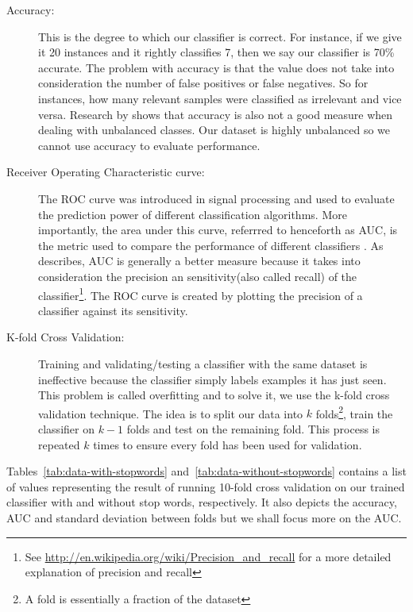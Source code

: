 \begin{description}
  \item[Accuracy:] This is the degree to which our classifier is correct. For instance, if we give
    it 20 instances and it rightly classifies 7, then we say our classifier is 70\% accurate. The
    problem with accuracy is that the value does not take into consideration the number of false
    positives or false negatives. So for instances, how many relevant samples were classified as
    irrelevant and vice versa. Research  by \citet{ling2003auc} shows that accuracy is also not a
    good measure when dealing with unbalanced classes. Our dataset is highly unbalanced so we cannot
    use accuracy to evaluate performance.

  \item[Receiver Operating Characteristic curve:] The ROC curve was introduced in signal processing
    and used to evaluate the prediction power of different classification algorithms. More
    importantly, the area under this curve, referrred to henceforth as AUC, is the metric used to
    compare the performance of different classifiers \citep{bradley1997use}. As \citet{ling2003auc,
    huang2005using} describes, AUC is generally a better measure because it takes into consideration
    the precision an sensitivity(also called recall) of the classifier\footnote{See
      \url{http://en.wikipedia.org/wiki/Precision_and_recall} for a more detailed explanation of
    precision and recall}. The ROC curve is created by plotting the precision of a classifier
    against its sensitivity.

  \item[K-fold Cross Validation:] Training and validating/testing a classifier with the same dataset
    is ineffective because the classifier simply labels examples it has just seen. This problem is
    called overfitting and to solve it, we use the k-fold cross validation technique. The idea is to
    split our data into $k$ folds\footnote{A fold is essentially a fraction of the dataset}, train
    the classifier on $k-1$ folds and test on the remaining fold. This process is repeated $k$ times
    to ensure every fold has been used for validation.
\end{description}

Tables~\ref{tab:data-with-stopwords} and~\ref{tab:data-without-stopwords} contains a list of values
representing the result of running 10-fold cross validation on our trained classifier with and
without stop words, respectively. It also depicts the accuracy, AUC and standard deviation between
folds but we shall focus more on the AUC.


